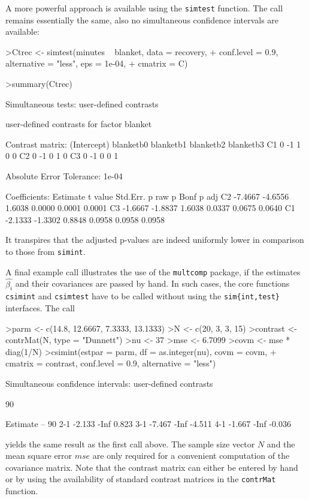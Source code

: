 \documentclass{article}
\begin{document}
A more powerful approach is available using the \texttt{simtest}
function. The call remains essentially the same, also no simultaneous confidence intervals are available:
\small
\begin{Schunk}
\begin{Sinput}
>Ctrec <- simtest(minutes ~ blanket, data = recovery, 
+     conf.level = 0.9, alternative = "less", eps = 1e-04, 
+     cmatrix = C)
\end{Sinput}
\end{Schunk}
\begin{Schunk}
\begin{Sinput}
>summary(Ctrec)
\end{Sinput}
\begin{Soutput}
	 Simultaneous tests: user-defined contrasts 

	 user-defined contrasts for factor blanket

Contrast matrix:
   (Intercept) blanketb0 blanketb1 blanketb2 blanketb3
C1           0        -1         1         0         0
C2           0        -1         0         1         0
C3           0        -1         0         0         1


Absolute Error Tolerance:  1e-04 

Coefficients:
   Estimate t value Std.Err.  p raw p Bonf  p adj
C2  -7.4667 -4.6556   1.6038 0.0000 0.0001 0.0001
C3  -1.6667 -1.8837   1.6038 0.0337 0.0675 0.0640
C1  -2.1333 -1.3302   0.8848 0.0958 0.0958 0.0958
\end{Soutput}
\end{Schunk}
\normalsize
It transpires that the adjusted p-values are indeed
uniformly lower in comparison to those from \texttt{simint}.

A final example call illustrates the use of the \texttt{multcomp} package, if the
estimates $\hat{\beta_i}$ and their covariances are passed by
hand. In such cases, the core functions \texttt{csimint} and
\texttt{csimtest} have to be called without using the
\texttt{sim\{int,test\}} interfaces. The call 
\small
\begin{Schunk}
\begin{Sinput}
>parm <- c(14.8, 12.6667, 7.3333, 13.1333)
>N <- c(20, 3, 3, 15)
>contrast <- contrMat(N, type = "Dunnett")
>nu <- 37
>mse <- 6.7099
>covm <- mse * diag(1/N)
>csimint(estpar = parm, df = as.integer(nu), covm = covm, 
+     cmatrix = contrast, conf.level = 0.9, alternative = "less")
\end{Sinput}
\begin{Soutput}
	Simultaneous confidence intervals: user-defined
	contrasts

	90 % confidence intervals

    Estimate   --   90 %
2-1   -2.133 -Inf  0.823
3-1   -7.467 -Inf -4.511
4-1   -1.667 -Inf -0.036
\end{Soutput}
\end{Schunk}
\normalsize 
yields the same result as the first call above. The
sample size vector $N$ and the mean square error $mse$ are only
required for a convenient computation of the covariance matrix.
Note that the contrast matrix can either be entered by hand or by
using the availability of standard contrast matrices in the
\texttt{contrMat} function.
\end{document}
